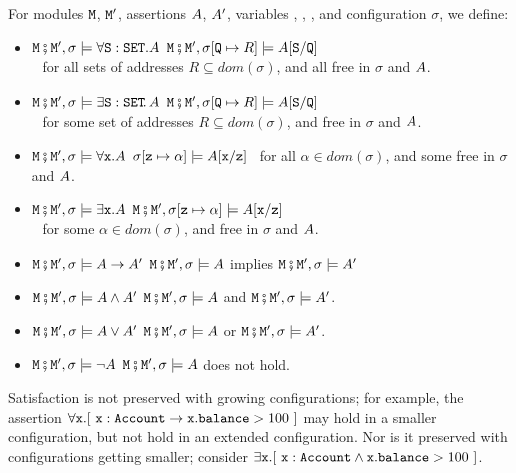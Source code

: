 \begin{definition}  
\label{def:valid:assertion:logical}
For modules $\M$, $\M'$, assertions $\A$, $\A'$, variables , , ,  and configuration $\sigma$, we define$:$
\begin{itemize}
\item
$\M\mkpair \M', \sigma \models \forall \prg{S}:\prg{SET}.\A$ \IFF  $\M\mkpair \M', \sigma[\prg{Q}\mapsto R] \models  \A[\prg{S}/\prg{Q}]$ \\
$\strut ~ $ \hfill for all sets of addresses $R\subseteq dom(\sigma)$, and  all  free in $\sigma$ and $\A$.
\item
$\M\mkpair \M', \sigma \models \exists \prg{S}:\prg{SET}\!.\,\A$ \IFF  $\M\mkpair \M', \sigma[\prg{Q}\mapsto R] \models  \A[\prg{S}/\prg{Q}]$ \\
 $\strut ~ $ \hfill  for some set of addresses $R\subseteq dom(\sigma)$, and    free in $\sigma$ and $\A$.
\item
$\M\mkpair \M', \sigma \models \forall \prg{x}.\A$ \IFF
$\sigma[\prg{z}\mapsto \alpha] \models  \A[\prg{x}/\prg{z}]$ \ for all  $\alpha\in dom(\sigma)$, and  some  free in $\sigma$ and $\A$.
\item
$\M\mkpair \M', \sigma \models \exists \prg{x}.\A$ \IFF
$\M\mkpair \M', \sigma[\prg{z}\mapsto \alpha] \models  \A[\prg{x}/\prg{z}]$\\
$\strut ~ $ \hfill for some  $\alpha\in dom(\sigma)$, and    free in $\sigma$ and $\A$.
\item
$\M\mkpair \M', \sigma \models \A \rightarrow \A' $ \IFF  $\M\mkpair \M', \sigma \models \A $ implies $\M\mkpair \M', \sigma \models \A' $
\item
$\M\mkpair \M', \sigma \models  \A \wedge \A'$   \IFF  $\M\mkpair \M', \sigma \models  \A $
and $\M\mkpair \M', \sigma \models  \A'$.
\item
$\M\mkpair \M', \sigma \models  \A \vee \A'$   \IFF  $\M\mkpair \M', \sigma \models  \A $
or $\M\mkpair \M', \sigma \models  \A'$.
\item
$\M\mkpair \M', \sigma \models  \neg\A$   \IFF  $\M\mkpair \M', \sigma \models  \A $
does not hold.
\end{itemize}
\end{definition}

Satisfaction is not preserved with growing configurations; for example, the assertion $\forall \x. [\ \x : \prg{Account} \rightarrow \x.\prg{balance}>100\ ]$ 
may hold in a smaller configuration, but not hold in an extended configuration. 
Nor is it preserved with configurations getting smaller; consider \eg $\exists \x. [\ \x : \prg{Account} \wedge \x.\prg{balance}>100\ ]$.

